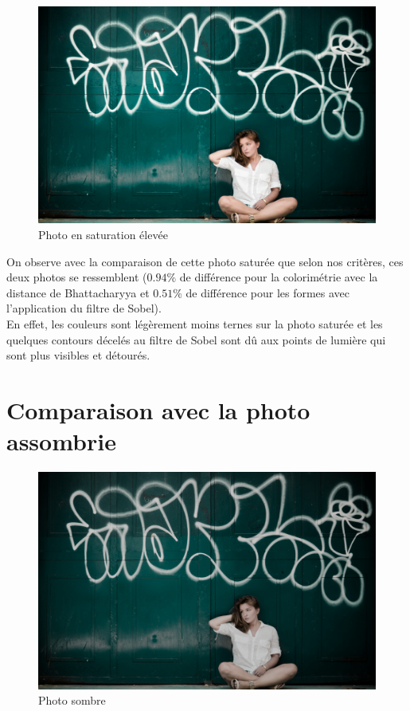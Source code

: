 \documentclass[]{article}
\begin{document}
\begin{figure}[htbp]
\centering
\includegraphics{photos/saturate.jpg}
\caption{Photo en saturation élevée}
\end{figure}

On observe avec la comparaison de cette photo saturée que selon nos
critères, ces deux photos se ressemblent ($0.94\%$ de différence pour la
colorimétrie avec la distance de Bhattacharyya et $0.51\%$ de différence
pour les formes avec l'application du filtre de Sobel).\\En effet, les
couleurs sont légèrement moins ternes sur la photo saturée et les
quelques contours décelés au filtre de Sobel sont dû aux points de
lumière qui sont plus visibles et détourés.

\newpage

\section{Comparaison avec la photo
assombrie}\label{comparaison-avec-la-photo-assombrie}

\begin{figure}[htbp]
\centering
\includegraphics{photos/sombre.jpg}
\caption{Photo sombre}
\end{figure}
\end{document}
